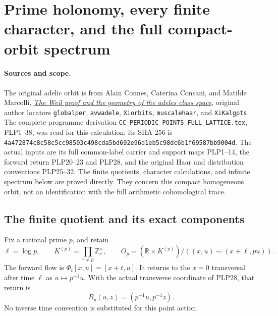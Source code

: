 \section{Prime holonomy, every finite character, and the full compact-orbit spectrum}
\label{sec:cc-prime-holonomy-spectra}

\paragraph{Sources and scope.}
The original adelic orbit is from Alain Connes, Caterina Consani,
and Matilde Marcolli,
\href{https://arxiv.org/abs/math/0703392v1}{\emph{The Weil proof and
the geometry of the adeles class space}}, original author locators
\texttt{globalper}, \texttt{avwadele}, \texttt{Xiorbits},
\texttt{muscalehaar}, and \texttt{XiKalgpts}.
The complete programme derivation
\nolinkurl{CC_PERIODIC_POINTS_FULL_LATTICE.tex}, PLP1--38,
was read for this calculation; its SHA-256 is
\texttt{4a472874c8c58c5c\allowbreak{}c98503c498cda5bd\allowbreak{}692e96d1eb5c98dc\allowbreak{}6b1f69587bb9004d}.
The actual inputs are its full common-label carrier and support
maps PLP1--14, the forward return PLP20--23 and PLP28, and the
original Haar and distribution conventions PLP25--32. The finite
quotients, character calculations, and infinite spectrum below are
proved directly. They concern this compact homogeneous orbit,
not an identification with the full arithmetic cohomological trace.

\subsection{The finite quotient and its exact components}

Fix a rational prime $p$, and retain
\begin{equation}\tag{PHS1}
 \ell=\log p,\qquad K^{(p)}=\prod_{r\ne p}\mathbb Z_r^\times,
 \qquad
 O_p=(\mathbb R\times K^{(p)})/
       ((x,u)\sim(x+\ell,pu)).
\end{equation}
The forward flow is $\Phi_t[x,u]=[x+t,u]$. It returns to the
$x=0$ transversal after time $\ell$ as $u\mapsto p^{-1}u$.
With the actual transverse coordinate of PLP28, that return is
\begin{equation}\tag{PHS2}
 R_p(u,z)=(p^{-1}u,p^{-1}z).
\end{equation}
No inverse time convention is substituted for this point action.

